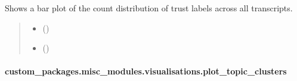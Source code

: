 \documentclass[letterpaper,10pt,english]{sphinxhowto}
\begin{document}
\begin{fulllineitems}
\label{\detokenize{_autosummary/custom_packages.misc_modules.visualisations.plot_trust_distribution:custom_packages.misc_modules.visualisations.plot_trust_distribution}}
\pysigstartsignatures
\pysiglinewithargsret
{}
{\sphinxparamcomma {}}
{}
\pysigstopsignatures
\sphinxAtStartPar
Shows a bar plot of the count distribution of trust labels across all transcripts.
\begin{quote}\begin{description}
\begin{itemize}
\item {} 
\sphinxAtStartPar
{} ()

\item {} 
\sphinxAtStartPar
{} ()

\end{itemize}

\sphinxAtStartPar
{}

\end{description}\end{quote}

\end{fulllineitems}


\sphinxstepscope


\paragraph{custom\_packages.misc\_modules.visualisations.plot\_topic\_clusters}
\label{\detokenize{_autosummary/custom_packages.misc_modules.visualisations.plot_topic_clusters:custom-packages-misc-modules-visualisations-plot-topic-clusters}}\label{\detokenize{_autosummary/custom_packages.misc_modules.visualisations.plot_topic_clusters::doc}}
\end{document}
